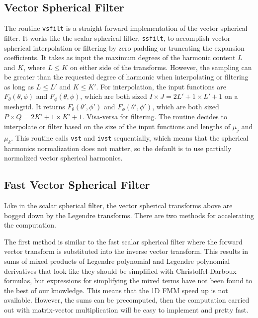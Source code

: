 {\footnotesize
{}
}


\subsection{Vector Spherical Filter}

The routine \texttt{vsfilt} is a straight forward implementation of the vector spherical filter.  It works like the scalar spherical filter, \texttt{ssfilt}, to accomplish vector spherical interpolation or filtering  by zero padding or truncating the expansion coefficients. It takes as input the maximum degrees of the harmonic content $L$ and $K$, where $L \le K$ on either side of the transforms. However, the sampling can be greater than the requested degree of harmonic when interpolating or filtering as long as $L\le L'$ and $K\le K'$.  For interpolation, the input functions are $F_{\theta}(\theta,\phi)$ and $F_{\phi}(\theta,\phi)$, which are both sized $I \times J = 2L'+1 \times L' + 1$ on a meshgrid. It returns $F_{\theta}(\theta',\phi')$ and $F_{\phi}(\theta',\phi')$, which are both sized $P \times Q = 2K'+1 \times K'+1$. Visa-versa for filtering. The routine decides to interpolate or filter based on the size of the input functions and lengths of $\mu_j$ and $\mu_k$. This routine calls \texttt{vst} and \texttt{ivst} sequentially, which means that the spherical harmonics normalization does not matter, so the default is to use partially normalized vector spherical harmonics. 

{\footnotesize
{}
}


\subsection{Fast Vector Spherical Filter}

Like in the scalar spherical filter, the vector spherical transforms above are bogged down by the Legendre transforms.  There are two methods for accelerating the computation.  

The first method is similar to the fast scalar spherical filter where the forward vector transform is substituted into the inverse vector transform. This results in sums of mixed products of Legendre polynomial and Legendre polynomial derivatives that look like they should be simplified with Christoffel-Darboux formulas, but expressions for simplifying the mixed terms have not been found to the best of our knowledge. This means that the 1D FMM speed up is not available. However, the sums can be precomputed, then the computation carried out with matrix-vector multiplication will be easy to implement and pretty fast. 

